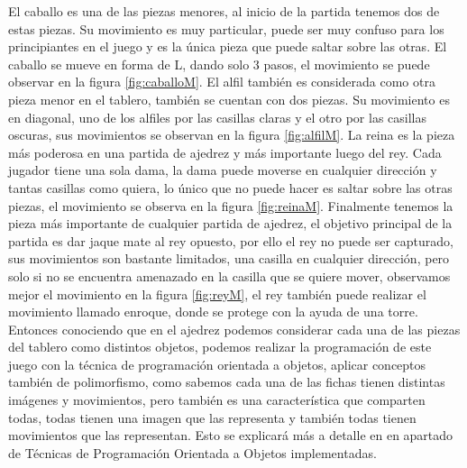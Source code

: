 \documentclass[conference]{IEEEtran}
\newcommand\tab[1][1cm]{\hspace*{#1}}
\begin{document}
    El caballo es una de las piezas menores, al inicio de la partida tenemos dos de estas piezas. Su movimiento es muy particular, puede ser muy confuso para los principiantes en el juego y es la única pieza que puede saltar sobre las otras. El caballo se mueve en forma de L, dando solo 3 pasos, el movimiento se puede observar en la figura \ref{fig:caballoM}. El alfil también es considerada como otra pieza menor en el tablero, también se cuentan con dos piezas. Su movimiento es en diagonal, uno de los alfiles por las casillas claras y el otro por las casillas oscuras, sus movimientos se observan en la figura \ref{fig:alfilM}.
    \newline
    \newline
    \tab[0.55cm] La reina es la pieza más poderosa en una partida de ajedrez y más importante luego del rey. Cada jugador tiene una sola dama, la dama puede moverse en cualquier dirección y tantas casillas como quiera, lo único que no puede hacer es saltar sobre las otras piezas, el movimiento se observa en la figura \ref{fig:reinaM}. Finalmente tenemos la pieza más importante de cualquier partida de ajedrez, el objetivo principal de la partida es dar jaque mate al rey opuesto, por ello el rey no puede ser capturado, sus movimientos son bastante limitados, una casilla en cualquier dirección, pero solo si no se encuentra amenazado en la casilla que se quiere mover, observamos mejor el movimiento en la figura \ref{fig:reyM}, el rey también puede realizar el movimiento llamado enroque, donde se protege con la ayuda de una torre.
 \newline
    \newline
    \tab[0.55cm] Entonces conociendo que en el ajedrez podemos considerar cada una de las piezas del tablero como distintos objetos, podemos realizar la programación de este juego con la técnica de programación orientada a objetos, aplicar conceptos también de polimorfismo, como sabemos cada una de las fichas tienen distintas imágenes y movimientos, pero también es una característica que comparten todas, todas tienen una imagen que las representa y también todas tienen movimientos que las representan. Esto se explicará más a detalle en en apartado de Técnicas de Programación Orientada a Objetos implementadas.
    
\end{document}
